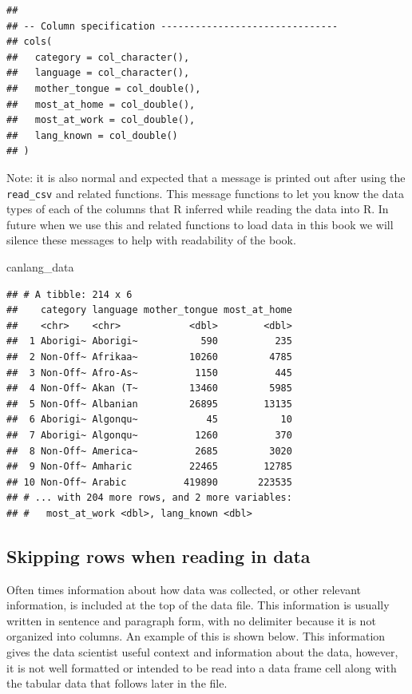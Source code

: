 \documentclass[
]{krantz}
\makeatletter
\newenvironment{Shaded}{\begin{snugshade}}{\end{snugshade}}
\newcommand{\NormalTok}[1]{#1}
\renewenvironment{quote}{\begin{VF}}{\end{VF}}
\newenvironment{kframe}{%
\medskip{}
\setlength{\fboxsep}{.8em}
 \def\at@end@of@kframe{}%
 \ifinner\ifhmode%
  \def\at@end@of@kframe{\end{minipage}}%
  \begin{minipage}{\columnwidth}%
 \fi\fi%
 \def\FrameCommand##1{\hskip\@totalleftmargin \hskip-\fboxsep
 \colorbox{shadecolor}{##1}\hskip-\fboxsep
     \hskip-\linewidth \hskip-\@totalleftmargin \hskip\columnwidth}%
 \MakeFramed {\advance\hsize-\width
   \@totalleftmargin\z@ \linewidth\hsize
   \@setminipage}}%
 {\par\unskip\endMakeFramed%
 \at@end@of@kframe}
\renewenvironment{Shaded}{\begin{kframe}}{\end{kframe}}
\makeatother
\begin{document}
\begin{verbatim}
## 
## -- Column specification -------------------------------
## cols(
##   category = col_character(),
##   language = col_character(),
##   mother_tongue = col_double(),
##   most_at_home = col_double(),
##   most_at_work = col_double(),
##   lang_known = col_double()
## )
\end{verbatim}

\begin{quote}
Note: it is also normal and expected that a message is printed out after using
the \texttt{read\_csv} and related functions. This message functions to let you know the
data types of each of the columns that R inferred while reading the data into R.
In future when we use this and related functions to load data in this book we
will silence these messages to help with readability of the book.
\end{quote}

\begin{Shaded}
\begin{Highlighting}[]
\NormalTok{canlang\_data}
\end{Highlighting}
\end{Shaded}

\begin{verbatim}
## # A tibble: 214 x 6
##    category language mother_tongue most_at_home
##    <chr>    <chr>            <dbl>        <dbl>
##  1 Aborigi~ Aborigi~           590          235
##  2 Non-Off~ Afrikaa~         10260         4785
##  3 Non-Off~ Afro-As~          1150          445
##  4 Non-Off~ Akan (T~         13460         5985
##  5 Non-Off~ Albanian         26895        13135
##  6 Aborigi~ Algonqu~            45           10
##  7 Aborigi~ Algonqu~          1260          370
##  8 Non-Off~ America~          2685         3020
##  9 Non-Off~ Amharic          22465        12785
## 10 Non-Off~ Arabic          419890       223535
## # ... with 204 more rows, and 2 more variables:
## #   most_at_work <dbl>, lang_known <dbl>
\end{verbatim}

\hypertarget{skipping-rows-when-reading-in-data}{%
\subsection{Skipping rows when reading in data}\label{skipping-rows-when-reading-in-data}}

Often times information about how data was collected, or other relevant information, is included at the top of the data file. This information is usually written in sentence and paragraph form, with no delimiter because it is not organized into columns. An example of this is shown below. This
information gives the data scientist useful context and information about the data, however, it is not well formatted or intended to be read into
a data frame cell along with the tabular data that follows later in the file.
\end{document}
